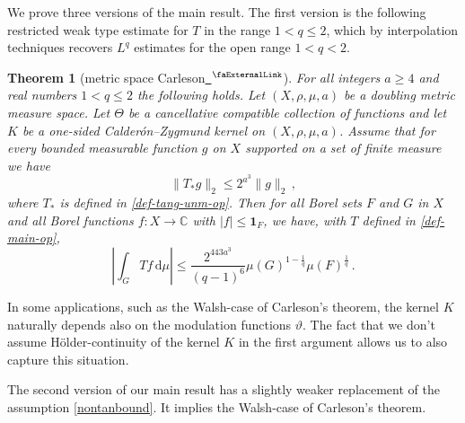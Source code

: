 \documentclass[12pt]{amsart}
\newcommand*{\complex}{\mathbb{C}} %
\newcommand{\extlink}{~\ensuremath{{}^\text{\faExternalLink}}}
\theoremstyle{definition}
\theoremstyle{plain}
\newtheorem{theorem}{Theorem}[subsection]
\newcommand{\mfa}{{\vartheta}}
\newcommand{\Mf}{{\Theta}}
\begin{document}
We prove three versions of the main result.
The first version is the following restricted weak type estimate for $T$ in the range $1<q\le 2$,
which by interpolation techniques recovers $L^q$ estimates for the open range $1<q<2$.
\begin{theorem}[metric space Carleson\href{https://github.com/fpvandoorn/carleson/blob/020d6e5c71d731952eb0379d222eea4049103ca0/Carleson/MetricCarleson/Main.lean\#L203}{\extlink}]
\label{metric-space-Carleson}
    For all integers $a \ge 4$ and real numbers $1<q\le 2$ the following holds.
    Let $(X,\rho,\mu,a)$ be a doubling metric measure space.
    Let $\Mf$ be a cancellative compatible collection of functions and let $K$ be a one-sided Calder\'on--Zygmund kernel on $(X,\rho,\mu,a)$.
    Assume that for every bounded measurable function $g$ on $X$ supported on a set of finite measure we have
    \begin{equation}\label{nontanbound}
        \|T_{*}g\|_{2} \leq 2^{a^3} \|g\|_2\,,
    \end{equation}
    where $T_{*}$ is defined in \eqref{def-tang-unm-op}.
    Then for all Borel sets $F$ and $G$ in $X$ and all Borel functions $f\colon X\to \complex$ with
    $|f|\le \mathbf{1}_F$, we have, with $T$ defined in \eqref{def-main-op},
    \begin{equation}
        \left|\int_{G} T f \, \mathrm{d}\mu\right| \leq \frac{2^{443a^3}}{(q-1)^6} \mu(G)^{1-\frac{1}{q}} \mu(F)^{\frac{1}{q}}\, .
    \end{equation}
\end{theorem}

In some applications, such as the Walsh-case of Carleson's theorem, the kernel $K$ naturally depends also on the modulation functions $\mfa$.
The fact that we don't assume H\"older-continuity of the kernel $K$ in the first argument allows us to also capture this situation.

The second version of our main result has a slightly weaker replacement of the assumption \eqref{nontanbound}.
It implies the Walsh-case of Carleson's theorem.
\end{document}
